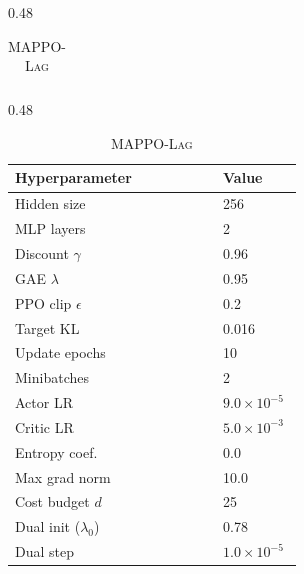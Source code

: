 \documentclass{article}
\theoremstyle{plain}
\theoremstyle{definition}
\theoremstyle{remark}
\begin{document}
\begin{table}[h!]
\begin{subtable}[t]{0.48\textwidth}
\begin{tabular}{@{}p{0.68\linewidth}p{0.26\linewidth}@{}}
\bottomrule
\end{tabular}
\end{subtable}\hfill
\begin{subtable}[t]{0.48\textwidth}
\caption{\textsc{MAPPO-Lag}}
\label{tab:hparams-mappolag}
\centering
\scriptsize
\setlength{\tabcolsep}{4pt}
\renewcommand{\arraystretch}{1.08}
\begin{tabular}{@{}p{0.68\linewidth}p{0.26\linewidth}@{}}
\toprule
\textbf{Hyperparameter} & \textbf{Value} \\
\midrule
Hidden size & 256 \\
MLP layers & 2 \\
Discount $\gamma$ & 0.96 \\
GAE $\lambda$ & 0.95 \\
PPO clip $\epsilon$ & 0.2 \\
Target KL & 0.016 \\
Update epochs & 10 \\
Minibatches & 2 \\
Actor LR & $9.0\times 10^{-5}$ \\
Critic LR & $5.0\times 10^{-3}$ \\
Entropy coef. & 0.0 \\
Max grad norm & 10.0 \\
\midrule
Cost budget $d$ & 25 \\
Dual init ($\lambda_0$) & 0.78 \\
Dual step & $1.0\times 10^{-5}$ \\
\bottomrule
\end{tabular}
\end{subtable}
\end{table}
\vfill

\end{document}
